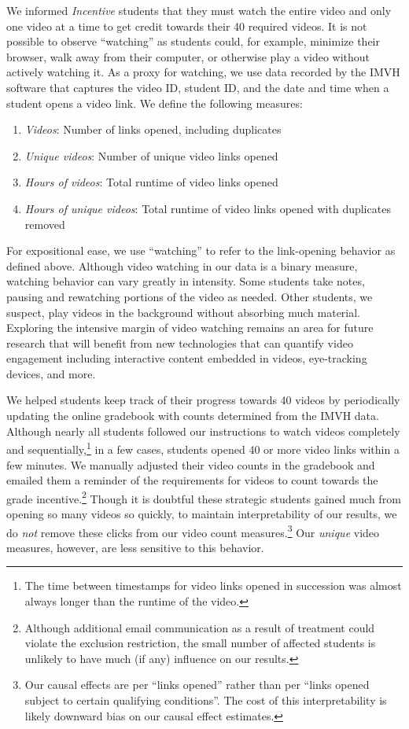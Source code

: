 \documentclass[12pt]{article}
\begin{document}
We informed \textit{Incentive} students that they must watch the entire video and only one video at a time to get credit towards their 40 required videos.
It is not possible to observe ``watching'' as students could, for example, minimize their browser, walk away from their computer, or otherwise play a video without actively watching it.
As a proxy for watching, we use data recorded by the IMVH software that captures the video ID, student ID, and the date and time when a student opens a video link.
We define the following measures:
\begin{enumerate}
	\item \textit{Videos}: Number of links opened, including duplicates
	\item \textit{Unique videos}: Number of unique video links opened
	\item \textit{Hours of videos}: Total runtime of video links opened
	\item \textit{Hours of unique videos}: Total runtime of video links opened with duplicates removed
\end{enumerate}

For expositional ease, we use ``watching'' to refer to the link-opening behavior as defined above.
Although video watching in our data is a binary measure, watching behavior can vary greatly in intensity.
Some students take notes, pausing and rewatching portions of the video as needed.
Other students, we suspect, play videos in the background without absorbing much material.
Exploring the intensive margin of video watching remains an area for future research that will benefit from new technologies that can quantify video engagement including interactive content embedded in videos, eye-tracking devices, and more.

We helped students keep track of their progress towards 40 videos by periodically updating the online gradebook with counts determined from the IMVH data.
Although nearly all students followed our instructions to watch videos completely and sequentially,\footnote{The time between timestamps for video links opened in succession was almost always longer than the runtime of the video.} in a few cases, students opened 40 or more video links within a few minutes.
We manually adjusted their video counts in the gradebook and emailed them a reminder of the requirements for videos to count towards the grade incentive.\footnote{Although additional email communication as a result of treatment could violate the exclusion restriction, the small number of affected students is unlikely to have much (if any) influence on our results.}
Though it is doubtful these strategic students gained much from opening so many videos so quickly, to maintain interpretability of our results, we do \textit{not} remove these clicks from our video count measures.\footnote{Our causal effects are per ``links opened'' rather than per ``links opened subject to certain qualifying conditions''. The cost of this interpretability is likely downward bias on our causal effect estimates.}
Our \textit{unique} video measures, however, are less sensitive to this behavior.
\end{document}

